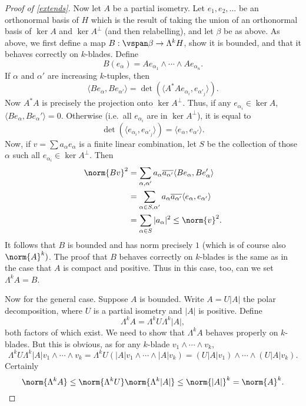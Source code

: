 \documentclass[12pt]{amsart}
\begin{document}
\begin{proof}[Proof of \cref{extends}]
Now let $A$ be a partial isometry. Let $e_1,e_2,\ldots$ be an orthonormal basis of $H$ which is the result of taking the union of an orthonormal basis of $\ker A$ and $\ker A^\bot$ (and then relabelling), and let $\beta$ be as above. As above, we first define a map $B:\vspan\beta \to \Lambda^k H$, show it is bounded, and that it behaves correctly on $k$-blades. Define 
\[B(e_\alpha) = Ae_{\alpha_1}\wedge \cdots \wedge Ae_{\alpha_n}.\] If $\alpha$ and $\alpha'$ are increasing $k$-tuples, then
\[\langle Be_\alpha,Be_{\alpha'}\rangle = \det (\langle A^\ast A e_{\alpha_i},e_{\alpha'_j}\rangle).\]
Now $A^\ast A$ is precisely the projection onto $\ker A^\bot$. Thus, if any $e_{\alpha_i} \in \ker A$, $\langle Be_\alpha,Be_\alpha'\rangle  = 0$. Otherwise (i.e.\ all $e_{\alpha_i}$ are in $\ker A^\bot$), it is equal to 
\[\det (\langle e_{\alpha_i},e_{\alpha'_j}\rangle) = \langle e_\alpha,e_{\alpha'}\rangle.\]
Now, if $v = \sum a_\alpha e_\alpha$ is a finite linear combination, let $S$ be the collection of those $\alpha$ such all $e_{\alpha_i} \in \ker A^\bot$. Then
\begin{align*}
\norm{Bv}^2 &= \sum_{\alpha,\alpha'}a_\alpha\overline{a_{\alpha'}}\langle Be_\alpha,Be_\alpha'\rangle\\
&= \sum_{\alpha \in S,\alpha'}a_\alpha\overline{a_{\alpha'}}\langle e_\alpha,e_{\alpha'}\rangle\\
&= \sum_{\alpha \in S} |a_\alpha|^2 \leq \norm{v}^2.\end{align*}
It follows that $B$ is bounded and has norm precisely $1$ (which is of course also $\norm{A}^k)$. The proof that $B$ behaves correctly on $k$-blades is the same as in the case that $A$ is compact and positive. Thus in this case, too, can we set $\Lambda^k A = B$.

Now for the general case. Suppose $A$ is bounded. Write $A = U|A|$ the polar decomposition, where $U$ is a partial isometry and $|A|$ is positive. Define
\[\Lambda^k A = \Lambda^k U \Lambda^k |A|,\] both factors of which exist. We need to show that $\Lambda^k A$ behaves properly on $k$-blades. But this is obvious, as for any $k$-blade $v_1\wedge \cdots \wedge v_k$,
\[\Lambda^k U \Lambda^k |A|v_1\wedge \cdots \wedge v_k = \Lambda^k U(|A|v_1 \wedge \cdots \wedge |A|v_k) = (U|A|v_1)\wedge \cdots \wedge (U|A|v_k).\]
Certainly \[\norm{\Lambda^k A} \leq \norm{\Lambda^k U}\norm{\Lambda^k |A|} \leq \norm{|A|}^k = \norm{A}^k.\]


\end{proof}
\end{document}
